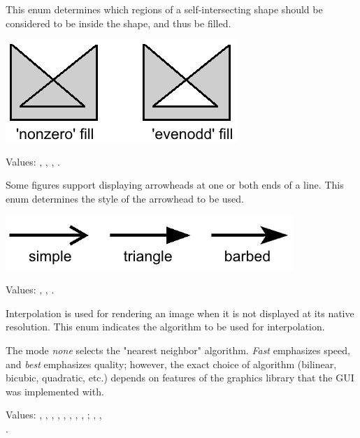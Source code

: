 This enum determines which regions of a self-intersecting shape
should be considered to be inside the shape, and thus be filled.

\begin{center}
\includegraphics[scale=0.8]{figures/graphics-fillrule}
\end{center}


Values: , , , .

Some figures support displaying arrowheads at one or both ends of a line.
This enum determines the style of the arrowhead to be used.

\begin{center}
\includegraphics[scale=0.8]{figures/graphics-arrowheads}
\end{center}


Values: , , .

Interpolation is used for rendering an image when it is not displayed at
its native resolution. This enum indicates the algorithm to be used for
interpolation.

The mode \textit{none} selects the "nearest neighbor" algorithm.
\textit{Fast} emphasizes speed, and \textit{best} emphasizes quality;
however, the exact choice of algorithm (bilinear, bicubic, quadratic, etc.)
depends on features of the graphics library that the GUI was implemented with.


Values:
, , , , ,
, , , ;
, , \\ .

